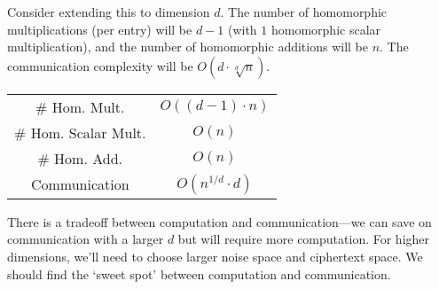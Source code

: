 
Consider extending this to dimension $d$. The number of homomorphic multiplications (per entry) will be $d-1$ (with $1$ homomorphic scalar multiplication), and the number of homomorphic additions will be $n$. The communication complexity will be $O(d\cdot \sqrt[d]{n})$.

\begin{center}
\begin{tabular}{c|c}
    \# Hom. Mult. & $O((d-1)\cdot n)$ \\
    \# Hom. Scalar Mult. & $O(n)$ \\
    \# Hom. Add. & $O(n)$ \\
    Communication & $O(n^{1/d}\cdot d)$
\end{tabular}
\end{center}

There is a tradeoff between computation and communication---we can save on communication with a larger $d$ but will require more computation. For higher dimensions, we'll need to choose larger noise space and ciphertext space. We should find the `sweet spot' between computation and communication.

